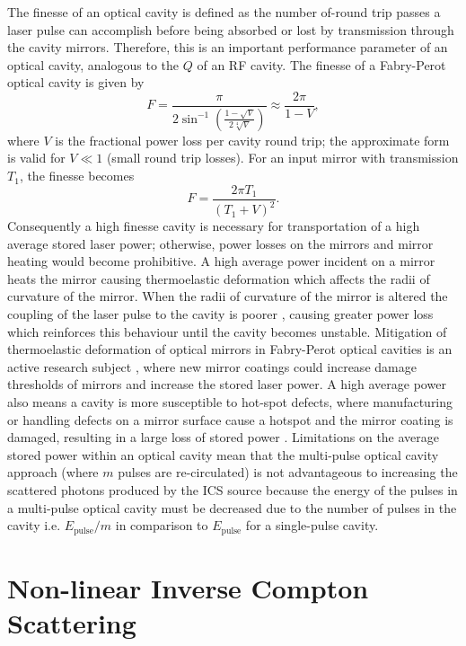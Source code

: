 \documentclass[../main.tex]{subfiles}
\begin{document}
The finesse of an optical cavity is defined as the number of-round trip passes a laser pulse can accomplish before being absorbed or lost by transmission through the cavity mirrors. Therefore, this is an important performance parameter of an optical cavity, analogous to the $Q$ of an RF cavity. The finesse of a Fabry-Perot optical cavity is given by \cite{ismail2016fabry}
\begin{equation}
F=\frac{\pi}{2\sin^{-1}\left(\frac{1-\sqrt{V}}{2\sqrt[4]{V}}\right)} \approx \frac{2\pi}{1-V},
\label{eq:finesse}    
\end{equation}
where $V$ is the fractional power loss per cavity round trip; the approximate form is valid for $V \ll 1$ (small round trip losses). For an input mirror with transmission $T_{1}$, the finesse becomes
\begin{equation}
F=\frac{2\pi T_{1}}{\left(T_{1}+V\right)^{2}}.
\label{eq:fabry_perot_finesse}    
\end{equation}
Consequently a high finesse cavity is necessary for transportation of a high average stored laser power; otherwise, power losses on the mirrors and mirror heating would become prohibitive. A high average power incident on a mirror heats the mirror causing thermoelastic deformation which affects the radii of curvature of the mirror. When the radii of curvature of the mirror is altered the coupling of the laser pulse to the cavity is poorer \cite{chaikovska2016high}, causing greater power loss which reinforces this behaviour until the cavity becomes unstable. Mitigation of thermoelastic deformation of optical mirrors in Fabry-Perot optical cavities is an active research subject \cite{amoudry2020modal}, where new mirror coatings could increase damage thresholds of mirrors and increase the stored laser power. A high average power also means a cavity is more susceptible to hot-spot defects, where manufacturing or handling defects on a mirror surface cause a hotspot and the mirror coating is damaged, resulting in a large loss of stored power \cite{wang2020prior}. Limitations on the average stored power within an optical cavity mean that the multi-pulse optical cavity approach (where $m$ pulses are re-circulated) is not advantageous to increasing the scattered photons produced by the ICS source because the energy of the pulses in a multi-pulse optical cavity must be decreased due to the number of pulses in the cavity i.e. $E_{\mathrm{pulse}}/m$ in comparison to $E_{\mathrm{pulse}}$ for a single-pulse cavity.    

\section{Non-linear Inverse Compton Scattering}
\label{sec:nonlinear_ICS}
\end{document}
